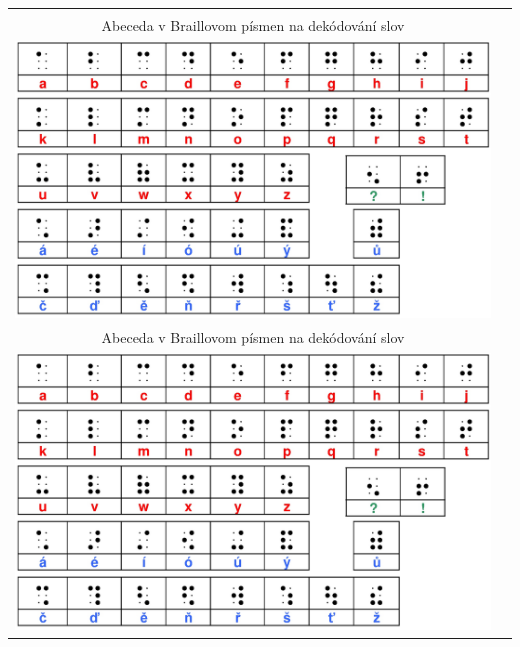 \documentclass[10pt]{report}
\begin{document}
\begin{tabular}{c c}
\begin{minipage}{0.47\textwidth}
\begin{center}
\phantom{x}\\[10mm]
{\Large Abeceda v Braillovom písmen na dekódování slov}\\[1mm]
\includegraphics[width=\textwidth]{../images/brailleSkratene.png}
\end{center}
\end{minipage}
&
\begin{minipage}{0.47\textwidth}
\begin{center}
\phantom{x}\\[10mm]
{\Large Abeceda v Braillovom písmen na dekódování slov}\\[1mm]
\includegraphics[width=\textwidth]{../images/brailleSkratene.png}
\end{center}
\end{minipage}

\end{tabular}
\end{document}
